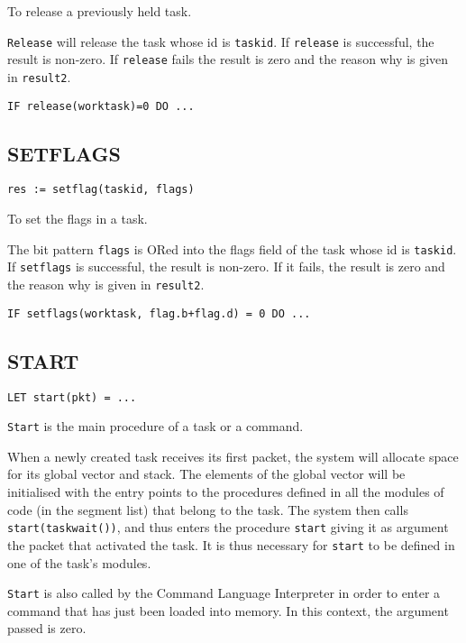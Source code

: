   To release a previously held task.


     \verb|Release| will release the task whose id is \verb|taskid|.
If \verb|release| is successful, the result is non-zero.  If
\verb|release| fails the result is zero and the reason why is given in
\verb|result2|.

\verb|IF release(worktask)=0 DO ...|


\subsection{SETFLAGS}

\verb|res := setflag(taskid, flags)|

  To set the flags in a task.


     The bit pattern \verb|flags| is ORed into the flags field of the
task whose id is \verb|taskid|.  If \verb|setflags| is successful, the
result is non-zero.  If it fails, the result is zero and the reason
why is given in \verb|result2|.

\verb|IF setflags(worktask, flag.b+flag.d) = 0 DO ...|


\subsection{START}

\verb|LET start(pkt) = ...|

 \verb|Start| is the main procedure of a task or a
command.


     When a newly created task receives its first packet, the system
will allocate space for its global vector and stack.  The elements of
the global vector will be initialised with the entry points to the
procedures defined in all the modules of code (in the segment list)
that belong to the task.  The system then calls \verb|start(taskwait())|,
and thus enters the procedure \verb|start| giving it as argument the packet
that activated the task.  It is thus necessary for \verb|start| to be
defined in one of the task's modules.

     \verb|Start| is also called by the Command Language Interpreter in
order to enter a command that has just been loaded into memory.  In
this context, the argument passed is zero.

